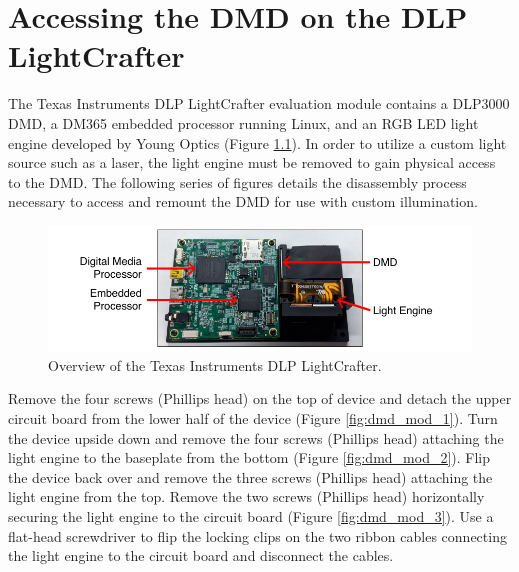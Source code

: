 
\chapter{Accessing the DMD on the DLP LightCrafter}

The Texas Instruments DLP LightCrafter evaluation module contains a DLP3000 DMD, a DM365 embedded processor running Linux, and an RGB LED light engine developed by Young Optics (Figure \ref{fig:dmd_mod_0}). In order to utilize a custom light source such as a laser, the light engine must be removed to gain physical access to the DMD. The following series of figures details the disassembly process necessary to access and remount the DMD for use with custom illumination.

\begin{figure}
    \includegraphics{figures/appendix_b/dmd_mod_0.pdf}
    \caption {
        \label{fig:dmd_mod_0}
        Overview of the Texas Instruments DLP LightCrafter.
    }
\end{figure}

Remove the four screws (Phillips head) on the top of device and detach the upper circuit board from the lower half of the device (Figure \ref{fig:dmd_mod_1}). Turn the device upside down and remove the four screws (Phillips head) attaching the light engine to the baseplate from the bottom (Figure \ref{fig:dmd_mod_2}). Flip the device back over and remove the three screws (Phillips head) attaching the light engine from the top. Remove the two screws (Phillips head) horizontally securing the light engine to the circuit board (Figure \ref{fig:dmd_mod_3}). Use a flat-head screwdriver to flip the locking clips on the two ribbon cables connecting the light engine to the circuit board and disconnect the cables.

